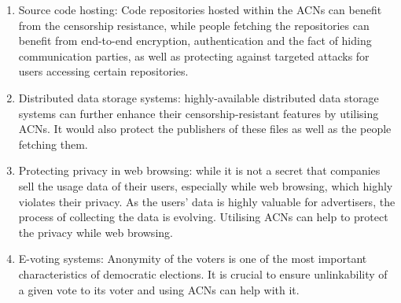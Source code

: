 \begin{enumerate}
    \item Source code hosting: Code repositories hosted within the ACNs can benefit from the censorship resistance, while people fetching the repositories can benefit from end-to-end encryption, authentication and the fact of hiding communication parties, as well as protecting against targeted attacks for users accessing certain repositories.
    \item Distributed data storage systems: highly-available distributed data storage systems can further enhance their censorship-resistant features by utilising ACNs. It would also protect the publishers of these files as well as the people fetching them.
    \item Protecting privacy in web browsing: while it is not a secret that companies sell the usage data of their users, especially while web browsing, which highly violates their privacy. As the users’ data is highly valuable for advertisers, the process of collecting the data is evolving. Utilising ACNs can help to protect the privacy while web browsing.
    \item E-voting systems: Anonymity of the voters is one of the most important characteristics of democratic elections. It is crucial to ensure unlinkability of a given vote to its voter and using ACNs can help with it.
\end{enumerate}

